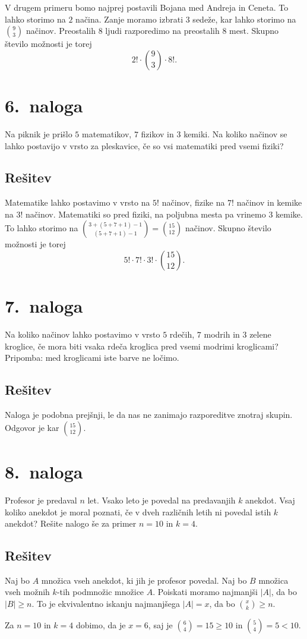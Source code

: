 \documentclass[11pt]{article}
\begin{document}
    V drugem primeru bomo najprej postavili Bojana med Andreja in Ceneta. To lahko storimo na \(2\) načina.
    Zanje moramo izbrati \(3\) sedeže, kar lahko storimo na \(\binom{9}{3}\) načinov. Preostalih \(8\) ljudi razporedimo na preostalih \(8\) mest.
    Skupno število možnosti je torej
    \[2! \cdot \binom{9}{3} \cdot 8!.\]

\section*{6.~naloga}
Na piknik je prišlo \(5\) matematikov, \(7\) fizikov in \(3\) kemiki. Na koliko načinov se lahko postavijo
v vrsto za pleskavice, če so vsi matematiki pred vsemi fiziki?

\subsection*{Rešitev}
    Matematike lahko postavimo v vrsto na \(5!\) načinov, fizike na \(7!\) načinov in kemike na \(3!\) načinov. 
    Matematiki so pred fiziki, na poljubna mesta pa vrinemo \(3\) kemike.
    To lahko storimo na \(\binom{3 + \left(5 + 7 + 1\right) - 1}{\left(5 + 7 + 1\right) - 1} = \binom{15}{12}\) načinov. Skupno število možnosti je torej
    \[5! \cdot 7! \cdot 3! \cdot \binom{15}{12}.\]

\section*{7.~naloga}
Na koliko načinov lahko postavimo v vrsto \(5\) rdečih, \(7\) modrih in \(3\) zelene kroglice, če mora
biti vsaka rdeča kroglica pred vsemi modrimi kroglicami?
Pripomba: med kroglicami iste barve ne ločimo.

\subsection*{Rešitev}
    Naloga je podobna prejšnji, le da nas ne zanimajo razporeditve znotraj skupin.
    Odgovor je kar \(\binom{15}{12}\).

\section*{8.~naloga}
Profesor je predaval \(n\) let. Vsako leto je povedal na predavanjih \(k\) anekdot. Vsaj koliko
anekdot je moral poznati, če v dveh različnih letih ni povedal istih \(k\) anekdot? Rešite nalogo
še za primer \(n = 10\) in \(k = 4\).

\subsection*{Rešitev}
    Naj bo \(A\) množica vseh anekdot, ki jih je profesor povedal. Naj bo \(B\) množica vseh možnih \(k\)-tih podmnožic množice \(A\).
    Poiskati moramo najmanjši \(|A|\), da bo \(|B| \ge n\). To je ekvivalentno iskanju najmanjšega \(|A| = x\), da bo \(\binom{x}{k} \ge n\).
    
    Za \(n = 10\) in \(k = 4\) dobimo, da je \(x = 6\), saj je \(\binom{6}{4} = 15 \ge 10\) in \(\binom{5}{4} = 5 < 10\).
\end{document}
